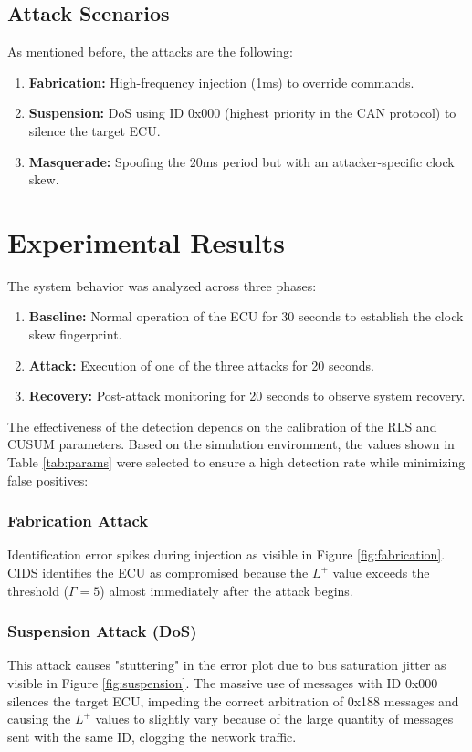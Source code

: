 \documentclass[12pt,twocolumn,letterpaper]{article} %
\begin{document}
\subsection{Attack Scenarios}
As mentioned before, the attacks are the following:
\begin{enumerate}
\item \textbf{Fabrication:} High-frequency injection (1ms) to override commands.
\item \textbf{Suspension:} DoS using ID 0x000 (highest priority in the CAN protocol) to silence the target ECU.
\item \textbf{Masquerade:} Spoofing the 20ms period but with an attacker-specific clock skew.
\end{enumerate}



\section{Experimental Results}
The system behavior was analyzed across three phases:
\begin{enumerate}
\item \textbf{Baseline:} Normal operation of the ECU for 30 seconds to establish the clock skew fingerprint.
\item \textbf{Attack:} Execution of one of the three attacks for 20 seconds.
\item \textbf{Recovery:} Post-attack monitoring for 20 seconds to observe system recovery.
\end{enumerate}
The effectiveness of the detection depends on the calibration of the RLS and CUSUM parameters. Based on the simulation environment, the values shown in Table \ref{tab:params} were selected to ensure a high detection rate while minimizing false positives:

\subsubsection{Fabrication Attack}
Identification error spikes during injection as visible in Figure \ref{fig:fabrication}. CIDS identifies the ECU as compromised because the $L^{+}$ value exceeds the threshold ($\Gamma = 5$) almost immediately after the attack begins.

\subsubsection{Suspension Attack (DoS)}
This attack causes "stuttering" in the error plot due to bus saturation jitter as visible in Figure \ref{fig:suspension}. The massive use of messages with ID 0x000 silences the target ECU, impeding the correct arbitration of 0x188 messages and causing the $L^{+}$ values to slightly vary because of the large quantity of messages sent with the same ID, clogging the network traffic.
\end{document}
